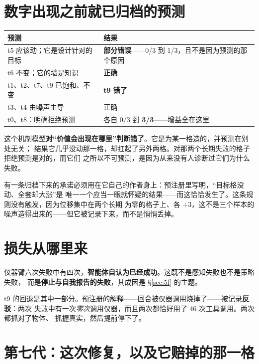 \documentclass[11pt,a4paper,UTF8,fontset=macnew]{ctexrep}
\begin{document}
\section{数字出现之前就已归档的预测}

\begin{table}[htbp]
\centering\small
\begin{tabularx}{\textwidth}{@{}X l@{}}
\toprule
\textbf{预测} & \textbf{结果} \\
\midrule
t5 应该动；它是设计针对的目标 & \textbf{部分错误}——0/3 到 1/3，且不是因为预测的那个原因 \\
t6 不变；它的墙是知识 & \textbf{正确} \\
t1、t2、t7、t9 已饱和、不变 & \textbf{t9 错了} \\
t3、t4 由噪声主导 & 正确 \\
t0、t8：明确拒绝预测 & 各自 0/3 到 \textbf{3/3}——增益全在这里 \\
\bottomrule
\end{tabularx}
\end{table}

\noindent
这个机制模型\textbf{对“价值会出现在哪里”判断错了}。它是为某一格造的，并预测在别处无关；
结果它几乎没动那一格，却扛起了另外两格。对那两个长期失败的格子拒绝预测是对的，而它们
之所以不可预测，是因为从来没有人诊断过它们为什么失败。

有一条归档下来的承诺必须用在它自己的作者身上：预注册里写明，“目标格没动、全套却大涨”是
唯一一个应当一眼就怀疑的结果——而这恰恰发生了。这条规则没有触发，因为位移集中在两个长期
为零的格子上、各 $+3$，这不是三个样本的噪声造得出来的——但它被记录下来，而不是悄悄丢掉。

\section{损失从哪里来}
\label{sec:losses}

仪器臂六次失败中有四次，\textbf{智能体自认为已经成功}。这既不是感知失败也不是策略失败，
而是\textbf{停止与自我报告的失败}，其成因是 §\ref{sec:5f} 的主题。

t9 的回退是其中一部分。预注册的解释——回合被仪器调用烧掉了——被记录\textbf{反驳}：两次
失败中有一次\emph{零次}调用仪器，而且两次都恰好用了 46 次工具调用。两次都抓对了物体、
抓握真实，然后提前停下了。

\section{第七代：这次修复，以及它赔掉的那一格}
\end{document}
